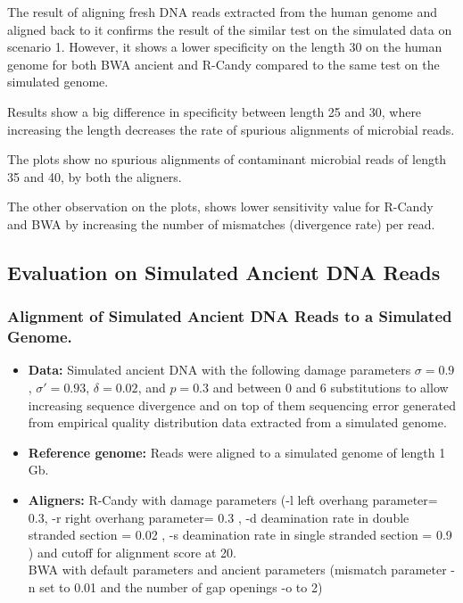 \documentclass[11pt,a4paper]{report}
\begin{document}
The result of aligning fresh DNA reads extracted from the human genome
and aligned back to it confirms the result of the similar test on the
simulated data on scenario 1.  However, it shows a lower specificity on
the length 30 on the human genome for both BWA ancient and R-Candy
compared to the same test on the simulated genome.

Results show a big difference in specificity between length 25 and 30, where 
increasing the length decreases the rate of spurious alignments of
microbial reads.

The plots show no spurious alignments of contaminant microbial reads of 
length 35 and 40, by both the aligners.

The other observation on the plots, shows lower sensitivity value for R-Candy 
and BWA by increasing the number of  mismatches (divergence rate) per read.



\subsection{Evaluation on Simulated Ancient DNA Reads}

\subsubsection{Alignment of Simulated Ancient DNA Reads to a Simulated Genome.}
\label{ Alignment of Simulated Ancient DNA Reads to a Simulated Genome.}

\begin{itemize}
 
   
    \item \textbf{Data:} Simulated ancient DNA 
     with the following damage parameters $ \sigma = 0.9$, 
    $ \sigma' = 0.93 $, $\delta = 0.02 $,  and $p = 0.3 $ \cite{mapdamage2}
    and between 0 and 6 substitutions to allow increasing sequence divergence
    and on top of them sequencing error generated from empirical quality distribution data
    extracted from a simulated genome.
  
 

  \item \textbf{Reference genome:}  Reads were aligned to a simulated genome of 
length 1 Gb.


  \item \textbf{Aligners:} R-Candy with damage parameters 
  (-l left overhang parameter= 0.3, -r right overhang parameter= 0.3 , 
-d deamination rate in double stranded section = 0.02 , 
-s deamination rate in single stranded section = 0.9 )
  and cutoff for alignment score at 20. \\
  BWA with default parameters and ancient parameters \cite{green2010draft}
   (mismatch parameter -n set to 0.01 and the number of gap openings -o
   to 2)

  \end{itemize}
\end{document}
